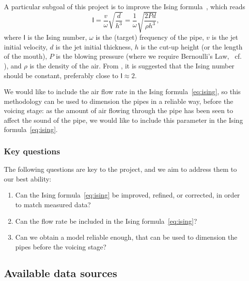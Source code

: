 \documentclass{psu-plan}
\begin{document}
A particular subgoal of this project is to improve the Ising
formula~\autocite{1971Ising-1}, which reads
\begin{equation}
    \label{eq:ising}
    \mathsf{I}
    =
    \frac{v}{\omega}\sqrt{\frac{d}{h^3}}
    =
    \frac{1}{\omega}\sqrt{\frac{2 P d}{\rho h^3}},
\end{equation}
where \(\mathsf{I}\) is the Ising number, \(\omega\) is the (target) frequency
of the pipe, \(v\) is the jet initial velocity, \(d\) is the jet initial
thickness, \(h\) is the cut-up height (or the length of the mouth), \(P\) is the
blowing pressure (where we require Bernoulli's Law, ~cf. \autocite{2025Lilj-1}),
and \(\rho\) is the density of the air.
From \autocite{1971Ising-1, 2025Lilj-1}, it is suggested that the Ising number
should be constant, preferably close to \( \mathsf{I} \approx 2\).

We would like to include the air flow rate in the Ising formula~\ref{eq:ising},
so this methodology can be used to dimension the pipes in a reliable way,
before the voicing stage: as the amount of air flowing through the pipe has been
seen to affect the sound of the pipe, we would like to include this parameter in
the Ising formula~\ref{eq:ising}.

\subsubsection{Key questions}

The following questions are key to the project, and we aim to address them to
our best ability:
\begin{enumerate}
    \item Can the Ising formula~\ref{eq:ising} be improved, refined, or
        corrected, in order to match measured data?
    \item Can the flow rate be included in the Ising formula~\ref{eq:ising}?
    \item Can we obtain a model reliable enough, that can be used to dimension the
        pipes before the voicing stage?
\end{enumerate}

\subsection{Available data sources}
\end{document}
